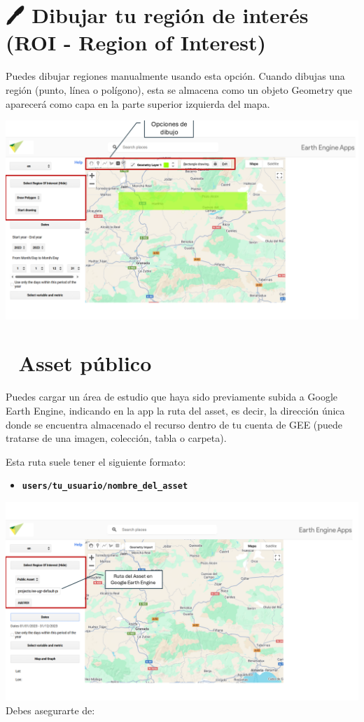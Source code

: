 \documentclass[
]{book}
\providecommand{\tightlist}{%
  \setlength{\itemsep}{0pt}\setlength{\parskip}{0pt}}
\begin{document}
\section{\texorpdfstring{\textbf{🖊️ Dibujar tu región de interés (ROI - Region of Interest)}}{🖊️ Dibujar tu región de interés (ROI - Region of Interest)}}\label{dibujar-tu-regiuxf3n-de-interuxe9s-roi---region-of-interest}

Puedes dibujar regiones manualmente usando esta opción. Cuando dibujas una región (punto, línea o polígono), esta se almacena como un objeto Geometry que aparecerá como capa en la parte superior izquierda del mapa.

\includegraphics{assets/dibujado.png}

\section{\texorpdfstring{\textbf{📂 Asset público}}{📂 Asset público}}\label{asset-puxfablico}

Puedes cargar un área de estudio que haya sido previamente subida a Google Earth Engine, indicando en la app la ruta del asset, es decir, la dirección única donde se encuentra almacenado el recurso dentro de tu cuenta de GEE (puede tratarse de una imagen, colección, tabla o carpeta).

Esta ruta suele tener el siguiente formato:

\begin{itemize}
\tightlist
\item
  \textbf{\texttt{users/tu\_usuario/nombre\_del\_asset}}
\end{itemize}

\includegraphics{assets/asset_es.png}
Debes asegurarte de:
\end{document}
